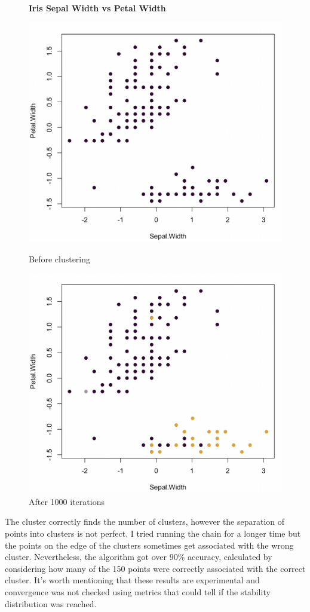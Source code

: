 \documentclass[12pt,a4paper]{article}
\begin{document}
\begin{figure} [H]
    \centering
    \textbf{Iris Sepal Width vs Petal Width}\par\medskip
    \begin{minipage}{.5\textwidth}
      \centering
      \includegraphics[width=0.8\linewidth]{width_before.png}
      \caption{Before clustering}
      \label{fig:width before clustering}
    \end{minipage}%
    \begin{minipage}{.5\textwidth}
      \centering
      \includegraphics[width=0.8\linewidth]{width_after.png}
      \caption{After 1000 iterations}
      \label{fig:width after clustering}
    \end{minipage}
\end{figure}

The cluster correctly finds the number of clusters, however the separation of points into clusters is not perfect. I tried running the chain for a longer time but the points on the edge of the clusters sometimes get associated with the wrong cluster. Nevertheless, the algorithm got over $90\%$ accuracy, calculated by considering how many of the 150 points were correctly associated with the correct cluster.
It's worth mentioning that these results are experimental and convergence was not checked using metrics that could tell if the stability distribution was reached.
\end{document}

